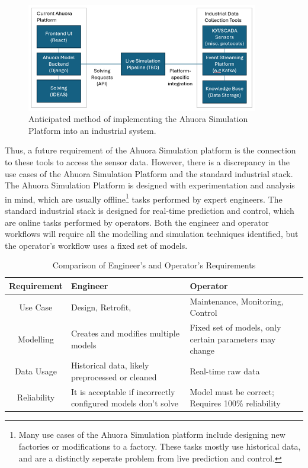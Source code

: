 \begin{figure}
    \centering
    \includegraphics[width=0.9\textwidth]{architecture.png}
    \caption{Anticipated method of implementing the Ahuora Simulation Platform into an industrial system.}
    \label{fig:architecture}
\end{figure}

 Thus, a future requirement of the Ahuora Simulation platform is the connection to these tools to access the sensor data. However, there is a discrepancy in the use cases of the Ahuora Simulation Platform and the standard industrial stack. The Ahuora Simulation Platform is designed with experimentation and analysis in mind, which are usually offline\footnote{Many use cases of the Ahuora Simulation platform include designing new factories or modifications to a factory. These tasks mostly use historical data, and are a distinctly seperate problem from live prediction and control.} tasks performed by expert engineers. The standard industrial stack is designed for real-time prediction and control, which are online tasks performed by operators. Both the engineer and operator workflows will require all the modelling and simulation techniques identified, but the operator's workflow uses a fixed set of models.

\begin{table}[ht]
    \centering
    \caption{Comparison of Engineer's and Operator's Requirements}
    \begin{tabular}{|c|p{}|p{}|}
        \hline
        \textbf{Requirement} & \textbf{Engineer} & \textbf{Operator} \\
        \hline
        Use Case & Design, Retrofit, & Maintenance, Monitoring, Control \\
        \hline
        Modelling & Creates and modifies multiple models & Fixed set of models, only certain parameters may change\\
        \hline
        Data Usage & Historical data, likely preprocessed or cleaned & Real-time raw data \\
        \hline
        Reliability & It is acceptable if incorrectly configured models don't solve & Model must be correct; Requires 100\% reliability \\
        \hline
    \end{tabular}
    \label{tab:requirements}
\end{table}

